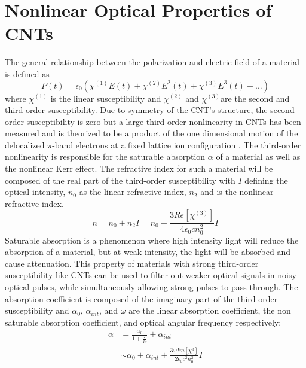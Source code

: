 \section{Nonlinear Optical Properties of CNTs}
The general relationship between the polarization and electric field of a material is defined \cite{yamashita} as
\begin{equation}
	P(t) = \epsilon_0(\chi^{(1)}E(t) + \chi^{(2)}E^2(t) + \chi^{(3)}E^3(t)+...)
\end{equation}
where $\chi^{(1)}$ is the linear susceptibility and $\chi^{(2)}$ and $\chi^{(3)}$are the second and third order susceptibility. Due to symmetry of the CNT’s structure, the second-order susceptibility is zero but a large third-order nonlinearity in CNTs has been measured \cite{martinez} and is theorized to be a product of the one dimensional motion of the delocalized $\pi$-band electrons at a fixed lattice ion configuration \cite{margulis}.  The third-order nonlinearity is responsible for the saturable absorption $\alpha$ of a material as well as the nonlinear Kerr effect.
The refractive index for such a material will be composed of the real part of the third-order susceptibility with $I$ defining the optical intensity, $n_0$  as the linear refractive index, $n_2$ and  is the nonlinear refractive index.
\begin{equation}
	n = n_0 + n_2I = n_0 + \frac{3Re[\chi^{(3)}]}{4\epsilon_0cn_0^2}I
	\label{eq:refractive_index}
\end{equation}
Saturable absorption is a phenomenon where high intensity light will reduce the absorption of a material, but at weak intensity, the light will be absorbed and cause attenuation. This property of materials with strong third-order susceptibility like CNTs can be used to filter out weaker optical signals in noisy optical pulses, while simultaneously allowing strong pulses to pass through. The absorption coefficient is composed of the imaginary part of the third-order susceptibility and $\alpha_0$, $\alpha_{int}$, and $\omega$ are the linear absorption coefficient, the non saturable absorption coefficient, and optical angular frequency respectively:
\begin{equation}
	\begin{aligned}
	\alpha &= \frac{\alpha_0}{1+\frac{I}{I_S}} + \alpha_{int}\\
	&\sim\alpha_0 + \alpha_{int} + \frac{3\omega Im[\chi^{3}]}{2\epsilon_0c^2n_0^2}I
	\end{aligned}
	\label{eq:absorption_coefficient}
\end{equation}
